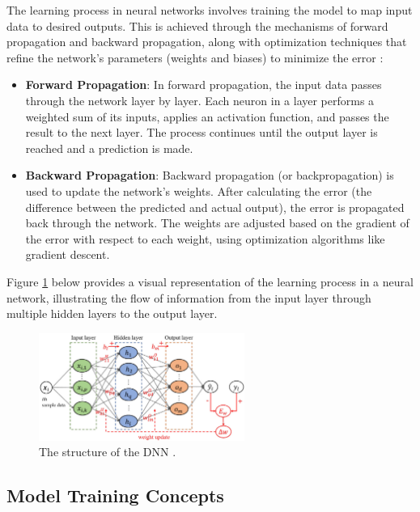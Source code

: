 The learning process in neural networks involves training the model to map input data to desired outputs. This is achieved through the mechanisms of forward propagation and backward propagation, along with optimization techniques that refine the network's parameters (weights and biases) to minimize the error \parencite{Kelleher2019}:
\begin{itemize}
    \item \textbf{Forward Propagation}: In forward propagation, the input data passes through the network layer by layer. Each neuron in a layer performs a weighted sum of its inputs, applies an activation function, and passes the result to the next layer. The process continues until the output layer is reached and a prediction is made.
    
    \item \textbf{Backward Propagation}: Backward propagation (or backpropagation) is used to update the network's weights. After calculating the error (the difference between the predicted and actual output), the error is propagated back through the network. The weights are adjusted based on the gradient of the error with respect to each weight, using optimization algorithms like gradient descent.
\end{itemize}

Figure \ref{fig:figure03} below provides a visual representation of the learning process in a neural network, illustrating the flow of information from the input layer through multiple hidden layers to the output layer.


\begin{figure}[H] %
    \centering
    \includegraphics[width=0.6\textwidth]{chapters/chapter1/images/Figure03.png}
    \caption{The structure of the DNN \cite{ren2023review}.}
    \label{fig:figure03}
\end{figure}



\subsection{Model Training Concepts}

